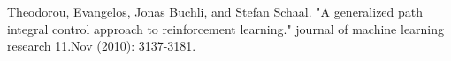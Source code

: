 \documentclass[journal]{IEEEtran}
\begin{document}
%










\ifCLASSOPTIONcaptionsoff
  \newpage
\fi





%
%
%
\begin{thebibliography}{1}

Theodorou, Evangelos, Jonas Buchli, and Stefan Schaal. "A generalized path integral control approach to reinforcement learning." journal of machine learning research 11.Nov (2010): 3137-3181.

\end{thebibliography}
\end{document}
